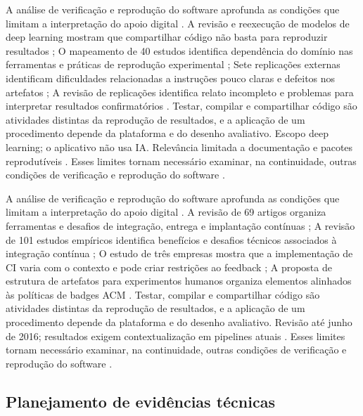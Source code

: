 A análise de verificação e reprodução do software aprofunda as condições que limitam a interpretação do apoio digital \citep{eng10} \citep{eng11} \citep{eng12} \citep{eng13}. A revisão e reexecução de modelos de deep learning mostram que compartilhar código não basta para reproduzir resultados \citep{eng10}; O mapeamento de 40 estudos identifica dependência do domínio nas ferramentas e práticas de reprodução experimental \citep{eng11}; Sete replicações externas identificam dificuldades relacionadas a instruções pouco claras e defeitos nos artefatos \citep{eng12}; A revisão de replicações identifica relato incompleto e problemas para interpretar resultados confirmatórios \citep{eng13}. Testar, compilar e compartilhar código são atividades distintas da reprodução de resultados, e a aplicação de um procedimento depende da plataforma e do desenho avaliativo. Escopo deep learning; o aplicativo não usa IA. Relevância limitada a documentação e pacotes reprodutíveis \citep{eng10} \citep{eng11} \citep{eng12} \citep{eng13}. Esses limites tornam necessário examinar, na continuidade, outras condições de verificação e reprodução do software \citep{eng10} \citep{eng11} \citep{eng12} \citep{eng13}.

A análise de verificação e reprodução do software aprofunda as condições que limitam a interpretação do apoio digital \citep{eng14} \citep{eng15} \citep{eng16} \citep{eng18}. A revisão de 69 artigos organiza ferramentas e desafios de integração, entrega e implantação contínuas \citep{eng14}; A revisão de 101 estudos empíricos identifica benefícios e desafios técnicos associados à integração contínua \citep{eng15}; O estudo de três empresas mostra que a implementação de CI varia com o contexto e pode criar restrições ao feedback \citep{eng16}; A proposta de estrutura de artefatos para experimentos humanos organiza elementos alinhados às políticas de badges ACM \citep{eng18}. Testar, compilar e compartilhar código são atividades distintas da reprodução de resultados, e a aplicação de um procedimento depende da plataforma e do desenho avaliativo. Revisão até junho de 2016; resultados exigem contextualização em pipelines atuais \citep{eng14} \citep{eng15} \citep{eng16} \citep{eng18}. Esses limites tornam necessário examinar, na continuidade, outras condições de verificação e reprodução do software \citep{eng14} \citep{eng15} \citep{eng16} \citep{eng18}.

\clearpage\subsection*{Planejamento de evidências técnicas}

